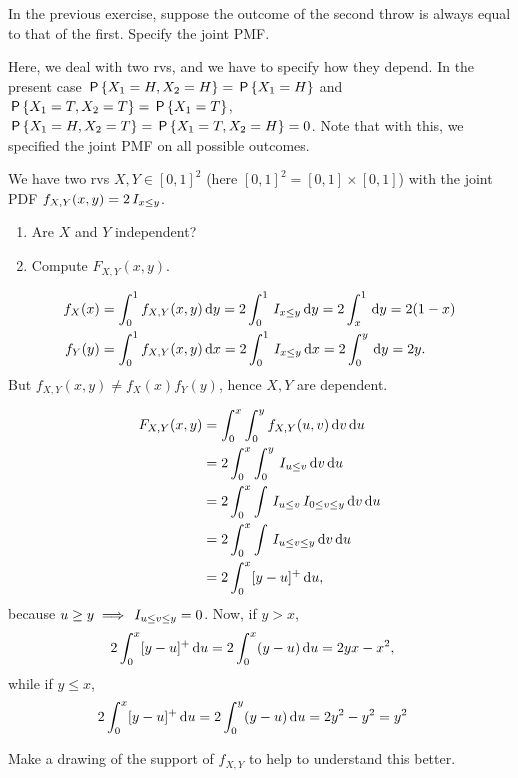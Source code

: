\begin{exercise}
In the previous exercise, suppose the outcome of the second throw is always equal to that of the first. Specify the joint PMF.
\begin{solution}
Here, we deal with two rvs, and we have to specify how they depend. In the present case $\P{X_1= H, X_2=H} = \P{X_1=H}$ and $\P{X_1= T, X_2=T} = \P{X_1=T}$, $\P{X_1= H, X_2=T} = \P{X_1= T, X_2=H} = 0$. Note that with this, we specified the joint PMF on all possible outcomes.
\end{solution}
\end{exercise}


\begin{exercise}
We have two rvs $X, Y \in [0,1]^{2}$ (here $[0,1]^{2} = [0,1]\times [0,1]$) with the joint PDF $f_{X,Y}(x,y) = 2 \1{x\leq y}$.
\begin{enumerate}
\item Are $X$ and $Y$ independent?
\item Compute $F_{X,Y}(x,y)$.
\end{enumerate}
\begin{solution}
\begin{align}
f_{X}(x) &= \int_{0}^{1} f_{X,Y}(x,y) \d y = 2\int_{0}^{1} \1{x\leq y} \d y = 2\int_{x}^{1} \d y = 2(1-x) \\
f_{Y}(y) &= \int_{0}^{1} f_{X,Y}(x,y) \d x = 2\int_{0}^{1} \1{x\leq y} \d x = 2\int_{0}^{y} \d y = 2 y.
\end{align}
But $f_{X,Y}(x,y) \neq f_{X}(x)f_{Y}(y)$, hence $X,Y$ are dependent.

\begin{align}
F_{X,Y}(x,y)
&= \int_{0}^{x}\int_{0}^{y} f_{X,Y}(u,v) \d v \d u \\
&= 2\int_{0}^{x}\int_{0}^{y} \1{u\leq v} \d v \d u \\
&= 2\int_{0}^{x}\int \1{u\leq v} \1{0\leq v \leq y}\d v \d u \\
&= 2\int_{0}^{x}\int  \1{u\leq v \leq y}\d v \d u \\
&= 2\int_{0}^{x} [y-u]^{+} \d u,
\end{align}
because $u\geq y \implies \1{u\leq v \leq y} = 0$. Now, if $y>x$,
\begin{align}
  2\int_{0}^{x} [y-u]^{+} \d u &=
  2\int_{0}^{x} (y-u) \d u = 2 y x - x^{2},
\end{align}
while if $y\leq x$,
\begin{align}
  2\int_{0}^{x} [y-u]^{+} \d u &=
  2\int_{0}^{y} (y-u) \d u = 2 y^{2} - y^{2} = y^{2}
\end{align}

Make a drawing of the support of $f_{X,Y}$ to help to understand this better.

\end{solution}
\end{exercise}


